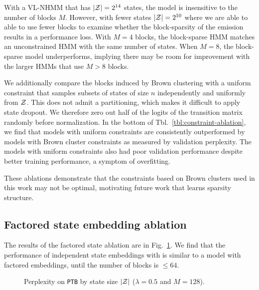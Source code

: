\documentclass[11pt,a4paper]{article}
\begin{document}
With a VL-NHMM that has $|\mathcal{Z}|=2^{14}$ states,
the model is insensitive to the number of blocks $M$.
However, with fewer states $|\mathcal{Z}|=2^{10}$ where we are able to
able to use fewer blocks to examine whether the block-sparsity
of the emission results in a performance loss.
With $M=4$ blocks, the block-sparse HMM matches an unconstrained HMM
with the same number of states.
When $M=8$, the block-sparse model underperforms,
implying there may be room for improvement with the larger
HMMs that use $M > 8$ blocks.

We additionally compare the blocks induced by Brown clustering with a uniform
constraint that samples subsets of states of size $n$
independently and uniformly from $\mathcal{Z}$.
This does not admit a partitioning, which makes it difficult to apply state dropout.
We therefore zero out half of the logits of the transition matrix randomly
before normalization.
In the bottom of Tbl.~\ref{tbl:constraint-ablation},
we find that models with uniform constraints
are consistently outperformed by models with Brown cluster constraints
as measured by validation perplexity.
The models with uniform constraints also had poor validation performance
despite better training performance, a symptom of overfitting.

These ablations demonstrate that the constraints based on
Brown clusters used in this work may not be optimal,
motivating future work that learns sparsity structure.

\subsection{Factored state embedding ablation}
The results of the factored state ablation are in Fig.~\ref{fig:fac-ablation}.
We find that the performance of independent state embeddings with
is similar to a model with factored embeddings,
until the number of blocks is $\le 64$.

\begin{figure}[h]
\centering
{}
\caption{\label{fig:fac-ablation}
Perplexity on \texttt{PTB} by state size $|\mathcal{Z}|$ ($\lambda =0.5$ and $M=128$).
}
\end{figure}
\end{document}
